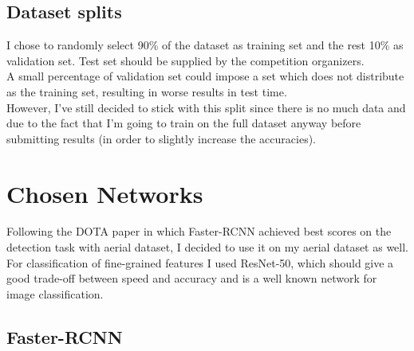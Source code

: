 \documentclass[]{article}
\begin{document}
\subsection{Dataset splits}
I chose to randomly select 90\% of the dataset as training set and the rest 10\% as validation set. Test set should be supplied by the competition organizers.\\
A small percentage of validation set could impose a set which does not distribute as the training set, resulting in worse results in test time.\\
However, I've still decided to stick with this split since there is no much data and due to the fact that I'm going to train on the full dataset anyway before submitting results (in order to slightly increase the accuracies).

\section{Chosen Networks}
Following the DOTA paper in which Faster-RCNN achieved best scores on the detection task with aerial dataset, I decided to use it on my aerial dataset as well.\\
For classification of fine-grained features I used ResNet-50, which should give a good trade-off between speed and accuracy and is a well known network for image classification.

\subsection{Faster-RCNN}
\end{document}
